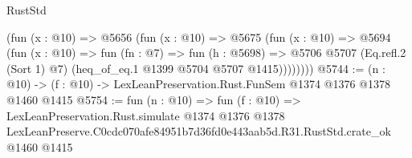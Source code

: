 \begin{lexlean}{RustStd}
\begin{coremodule}
          (fun (x : @10) =>
          @5656
            (fun (x : @10) =>
            @5675
              (fun (x : @10) =>
              @5694
                (fun (x : @10) =>
                fun (fn : @7) =>
                fun (h : @5698) =>
                @5706 @5707 (Eq.refl.{2} (Sort 1) @7) (heq_of_eq.{1} @1399 @5704 @5707 @1415))))))))
@5744 := (n : @10) -> (f : @10) -> LexLeanPreservation.Rust.FunSem @1374 @1376 @1378 @1460 @1415
@5754 := fun (n : @10) =>
  fun (f : @10) =>
  LexLeanPreservation.Rust.simulate
    @1374
    @1376
    @1378
    LexLeanPreserve.C0cdc070afe84951b7d36fd0e443aab5d.R31.RustStd.crate_ok
    @1460
    @1415
\end{coremodule}
\end{lexlean}
